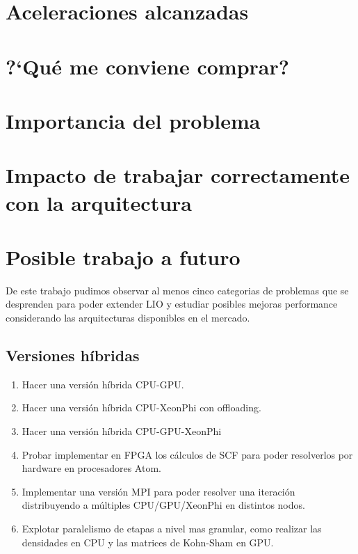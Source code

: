 \section{Aceleraciones alcanzadas}
%


\section{?`Qu\'e me conviene comprar?}


\section{Importancia del problema}
\section{Impacto de trabajar correctamente con la arquitectura}
\section{Posible trabajo a futuro}
De este trabajo pudimos observar al menos cinco categorias de problemas que se
desprenden para poder extender LIO y estudiar posibles mejoras performance considerando
las arquitecturas disponibles en el mercado.
\subsection{Versiones h\'ibridas}
\begin{enumerate}
  \item Hacer una versi\'on h\'ibrida CPU-GPU.
  \item Hacer una versi\'on h\'ibrida CPU-XeonPhi con offloading.
  \item Hacer una versi\'on h\'ibrida CPU-GPU-XeonPhi
  \item Probar implementar en FPGA los c\'alculos de SCF para poder resolverlos por hardware en procesadores
    Atom.
  \item Implementar una versi\'on MPI para poder resolver una iteraci\'on distribuyendo
    a m\'ultiples CPU/GPU/XeonPhi en distintos nodos.
  \item Explotar paralelismo de etapas a nivel mas granular, como realizar las densidades en CPU y las matrices
    de Kohn-Sham en GPU.
\end{enumerate}

